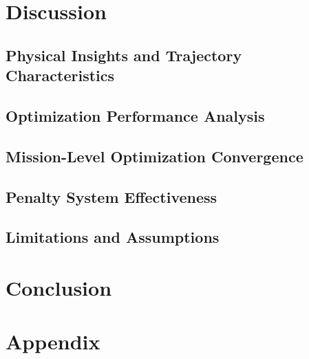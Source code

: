 \documentclass[12pt, a4paper]{report}
\begin{document}
\newpage
\chapter{Discussion}
\label{chap:Discussion}

\section{Physical Insights and Trajectory Characteristics}
\label{sec:physical_insights}


\section{Optimization Performance Analysis}
\label{sec:optimization_performance}


\section{Mission-Level Optimization Convergence}
\label{sec:mission_convergence}


\section{Penalty System Effectiveness}
\label{sec:penalty_effectiveness}


\section{Limitations and Assumptions}
\label{sec:limitations}


\newpage
\chapter{Conclusion}
\label{chap:Conclusion}
% 

\printbibliography

\appendix
\chapter{Appendix}
% 
\end{document}
